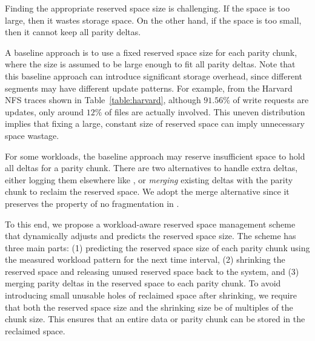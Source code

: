 Finding the appropriate reserved space size is challenging.  If the space is
too large, then it wastes storage space.   On the other hand, if the space is
too small, then it cannot keep all parity deltas.  




A baseline approach is to use a fixed reserved space size for each parity
chunk, where the size is assumed to be large enough to fit all parity deltas.  
Note that this baseline approach can introduce
significant storage overhead, since different segments may have different
update patterns.  For example, from the Harvard NFS traces shown in
Table~\ref{table:harvard}, although $91.56\%$ of write requests are updates,
only around $12\%$ of files are actually involved.  This uneven distribution
implies that fixing a large, constant size of reserved space can imply
unnecessary space wastage. 

For some workloads, the baseline approach may reserve insufficient space to
hold all deltas for a parity chunk. There are two alternatives to handle extra
deltas, either logging them elsewhere like \PL, or \textit{merging} existing
deltas with the parity chunk to reclaim the reserved space.  We adopt the
merge alternative since it preserves the property of no fragmentation in
\PLR.

To this end, we propose a workload-aware reserved space management scheme that
dynamically adjusts and predicts the reserved space size. The scheme has
three main parts: 
(1) predicting the reserved space size of each parity chunk 
using the measured workload pattern for the next time interval, 
(2) shrinking the reserved space and releasing unused reserved space back to 
the system, and
(3) merging parity deltas in the reserved space to each parity chunk.
To avoid introducing small unusable holes of reclaimed space after shrinking,
we require that both the reserved space size and the shrinking size be of
multiples of the chunk size.  This ensures that an entire data or parity chunk
can be stored in the reclaimed space. 

